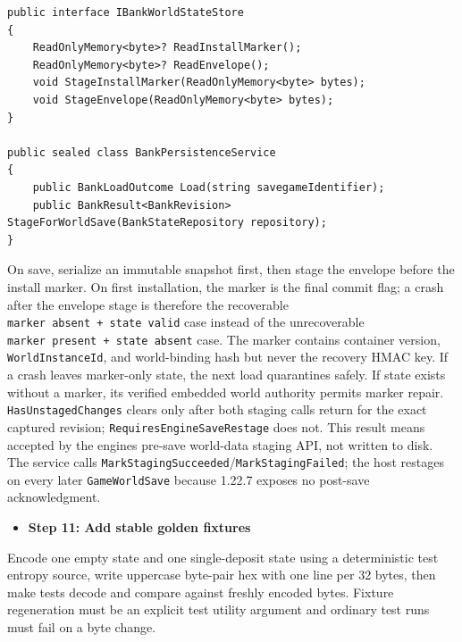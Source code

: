 \documentclass[
  10pt,
  letterpaper,
]{article}
\newcommand{\passthrough}[1]{#1}
\providecommand{\tightlist}{%
  \setlength{\itemsep}{0pt}\setlength{\parskip}{0pt}}
\begin{document}
\begin{lstlisting}
public interface IBankWorldStateStore
{
    ReadOnlyMemory<byte>? ReadInstallMarker();
    ReadOnlyMemory<byte>? ReadEnvelope();
    void StageInstallMarker(ReadOnlyMemory<byte> bytes);
    void StageEnvelope(ReadOnlyMemory<byte> bytes);
}

public sealed class BankPersistenceService
{
    public BankLoadOutcome Load(string savegameIdentifier);
    public BankResult<BankRevision> StageForWorldSave(BankStateRepository repository);
}
\end{lstlisting}

On save, serialize an immutable snapshot first, then stage the envelope
before the install marker. On first installation, the marker is the
final commit flag; a crash after the envelope stage is therefore the
recoverable
\texttt{marker\ }\allowbreak{}\texttt{absent\ }\allowbreak{}\texttt{+\ }\allowbreak{}\texttt{state\ }\allowbreak{}\texttt{valid}
case instead of the unrecoverable
\texttt{marker\ }\allowbreak{}\texttt{present\ }\allowbreak{}\texttt{+\ }\allowbreak{}\texttt{state\ }\allowbreak{}\texttt{absent}
case. The marker contains container version,
\passthrough{\lstinline!WorldInstanceId!}, and world-binding hash but
never the recovery HMAC key. If a crash leaves marker-only state, the
next load quarantines safely. If state exists without a marker, its
verified embedded world authority permits marker repair.
\passthrough{\lstinline!HasUnstagedChanges!} clears only after both
staging calls return for the exact captured revision;
\texttt{RequiresEngineSaveRestage} does not. This result means accepted
by the engine\textquotesingle s pre-save world-data staging API, not
written to disk. The service calls
\passthrough{\lstinline!MarkStagingSucceeded!}/\passthrough{\lstinline!MarkStagingFailed!};
the host restages on every later \passthrough{\lstinline!GameWorldSave!}
because 1.22.7 exposes no post-save acknowledgment.

\begin{itemize}
\tightlist
\item[$\square$]
  \textbf{Step 11: Add stable golden fixtures}
\end{itemize}

Encode one empty state and one single-deposit state using a
deterministic test entropy source, write uppercase byte-pair hex with
one line per 32 bytes, then make tests decode and compare against
freshly encoded bytes. Fixture regeneration must be an explicit test
utility argument and ordinary test runs must fail on a byte change.
\end{document}

